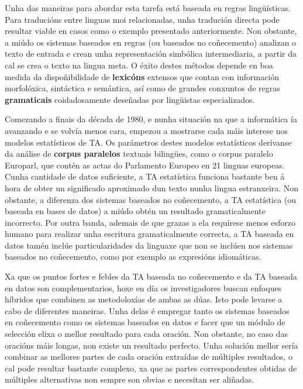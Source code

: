 \begin{multicols}{2}
Unha das maneiras para abordar esta tarefa está baseada en regras lingüísticas. Para traducións entre linguas moi relacionadas, unha tradución directa pode resultar viable en casos como o exemplo presentado anteriormente. Non obstante, a miúdo os sistemas baseados en regras (ou baseados no coñecemento) analizan o texto de entrada e crean unha representación simbólica intermediaria, a partir da cal se crea o texto na lingua meta. O éxito destes métodos depende en boa medida da dispoñibilidade de \textbf{lexicóns} extensos que contan con información morfolóxica, sintáctica e semántica, así como de grandes conxuntos de regras \textbf{gramaticais} coidadosamente deseñadas por lingüistas especializados.

Comezando a finais da década de 1980, e nunha situación na que a informática ía avanzando e se volvía menos cara, empezou a mostrarse cada máis interese nos modelos estatísticos de TA. Os parámetros destes modelos estatísticos derívanse da análise de \textbf{corpus paralelos} textuais bilingües, como o corpus paralelo Europarl, que contén as actas do Parlamento Europeo en 21 linguas europeas. Cunha cantidade de datos suficiente, a TA estatística funciona bastante ben á hora de obter un significado aproximado dun texto nunha lingua estranxeira. Non obstante, a diferenza dos sistemas baseados no coñecemento, a TA estatística (ou baseada en bases de datos) a miúdo obtén un resultado gramaticalmente incorrecto. Por outra banda, ademais de que grazas a ela requírese menos esforzo humano para realizar unha escritura gramaticalmente correcta, a TA baseada en datos tamén inclúe particularidades da linguaxe que non se inclúen nos sistemas baseados no coñecemento, como por exemplo as expresións idiomáticas. 

Xa que os puntos fortes e febles da TA baseada no coñecemento e da TA baseada en datos son complementarios, hoxe en día os investigadores buscan enfoques híbridos que combinen as metodoloxías de ambas as dúas. Isto pode levarse a cabo de diferentes maneiras. Unha delas é empregar tanto os sistemas baseados en coñecemento como os sistemas baseados en datos e facer que un módulo de selección elixa o mellor resultado para cada oración. Non obstante, no caso das oracións máis longas, non existe un resultado perfecto. Unha solución mellor sería combinar as mellores partes de cada oración extraídas de múltiples resultados, o cal pode resultar bastante complexo, xa que as partes correspondentes obtidas de múltiples alternativas non sempre son obvias e necesitan ser aliñadas. 


\end{multicols}

